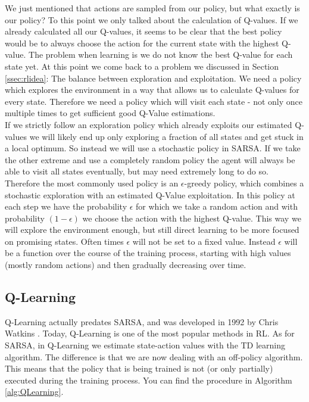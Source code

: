 We just mentioned that actions are sampled from our policy, but what exactly is our policy? To this point we only talked about the calculation of Q-values. If we already calculated all our Q-values, it seems to be clear that the best policy would be to always choose the action for the current state with the highest Q-value. The problem when learning is we do not know the best Q-value for each state yet. At this point we come back to a problem we discussed in Section \ref{ssec:rlidea}: The balance between exploration and exploitation. We need a policy which explores the environment in a way that allows us to calculate Q-values for every state. Therefore we need a policy which will visit each state - not only once multiple times to get sufficient good Q-Value estimations. \\ 
If we strictly follow an exploration policy which already exploits our estimated Q-values we will likely end up only exploring a fraction of all states and get stuck in a local optimum. So instead we will use a stochastic policy in SARSA. If we take the other extreme and use a completely random policy the agent will always be able to visit all states eventually, but may need extremely long to do so. Therefore the most commonly used policy is an $\epsilon$-greedy policy, which combines a stochastic exploration with an estimated Q-Value exploitation. In this policy at each step we have the probability $\epsilon$ for which we take a random action and with probability $(1 - \epsilon)$ we choose the action with the highest Q-value. This way we will explore the environment enough, but still direct learning to be more focused on promising states. Often times $\epsilon$ will not be set to a fixed value. Instead $\epsilon$ will be a function over the course of the training process, starting with high values (mostly random actions) and then gradually decreasing over time. 

\subsection{Q-Learning} \label{ssec:Q_Learning}
Q-Learning actually predates SARSA, and was developed in 1992 by Chris Watkins \cite{watkins1992q}. Today, Q-Learning is one of the most popular methods in RL. As for SARSA, in Q-Learning we estimate state-action values with the TD learning algorithm. The difference is that we are now dealing with an off-policy algorithm. This means that the policy that is being trained is not (or only partially) executed during the training process. You can find the procedure in Algorithm \ref{alg:QLearning}.  

